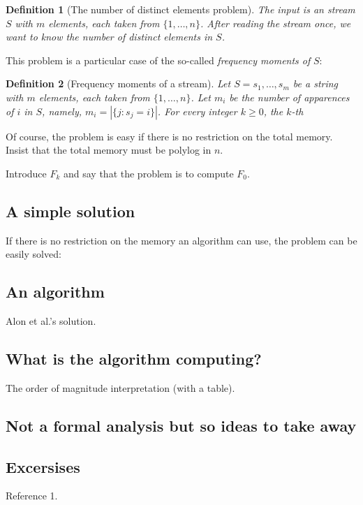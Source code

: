 \documentclass[11pt]{article}
\newtheorem{definition}{Definition}
\begin{document}
\begin{definition}[The number of distinct elements problem]
The input is an stream $S$ with $m$ elements, each taken from $\{1, \hdots, n\}$.
After reading the stream once, we want to know the number of distinct elements in $S$.
\end{definition}

This problem is a particular case of the so-called \emph{frequency moments of} $S$:


\begin{definition}[Frequency moments of a stream]
Let $S = s_1, \hdots, s_m$ be a string with $m$ elements, each taken from $\{1, \hdots, n\}$.
Let $m_i$ be the number of apparences of $i$ in $S$, namely, $m_i = | \{j : s_j = i\} |$.
For every integer $k \geq 0$, the \emph{$k$-th} 
\end{definition}


Of course, the problem is easy if there is no restriction on the total memory.
Insist that the total memory must be polylog in $n$.

Introduce $F_k$ and say that the problem is to compute $F_0$.



\subsection{A simple solution}
If there is no restriction on the memory an algorithm can use, the problem can be easily solved:






\subsection{An algorithm}

Alon et al.'s solution.

\subsection{What is the algorithm computing?}

The order of magnitude interpretation (with a table).


\subsection{Not a formal analysis but so ideas to take away}


\subsection{Excersises}



\begin{thebibliography}{XXX}

 Reference 1.

\end{thebibliography}
\end{document}
